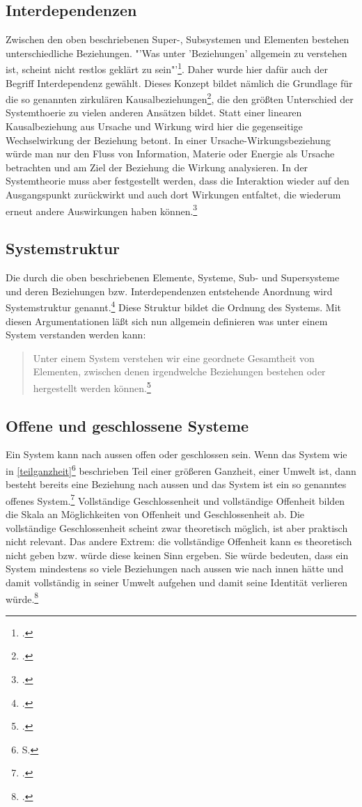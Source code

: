 \documentclass[a4paper,12pt]{article}
\begin{document}
\subsection{Interdependenzen}\label{interdep}
Zwischen den oben beschriebenen Super-, Subsystemen und Elementen bestehen unterschiedliche Beziehungen. "'Was unter 'Beziehungen' allgemein zu verstehen ist, scheint nicht restlos geklärt zu sein"'\footcite[109]{Ulrich1968}. Daher wurde hier dafür auch der Begriff Interdependenz gewählt. Dieses Konzept bildet nämlich die Grundlage für die so genannten zirkulären Kausalbeziehungen\footcite[S. 104]{Helfrich2024}, die den größten Unterschied der Systemthoerie zu vielen anderen Ansätzen bildet. Statt einer linearen Kausalbeziehung aus Ursache und Wirkung wird hier die gegenseitige Wechselwirkung der Beziehung betont. In einer Ursache-Wirkungsbeziehung würde man nur den Fluss von Information, Materie oder Energie als Ursache betrachten und am Ziel der Beziehung die Wirkung analysieren. In der Systemtheorie muss aber festgestellt werden, dass die Interaktion wieder auf den Ausgangspunkt zurückwirkt und auch dort Wirkungen entfaltet, die wiederum erneut andere Auswirkungen haben können.\footcite[S. 104]{Helfrich2024} 
\subsection{Systemstruktur}\label{systemstruktur}
Die durch die oben beschriebenen Elemente, Systeme, Sub- und Supersysteme und deren Beziehungen bzw. Interdependenzen entstehende Anordnung wird Systemstruktur genannt.\footcite[S. 110]{Ulrich1968} Diese Struktur bildet die Ordnung des Systems. Mit diesen Argumentationen läßt sich nun allgemein definieren was unter einem System verstanden werden kann:
\begin{quote}
    Unter einem System verstehen wir eine geordnete Gesamtheit von Elementen, zwischen denen irgendwelche Beziehungen bestehen oder hergestellt werden können.\footcite[S. 105]{Ulrich1968}
\end{quote}
\subsection{Offene und geschlossene Systeme}\label{offengeschlossen}
Ein System kann nach aussen offen oder geschlossen sein. Wenn das System wie in \ref{teilganzheit}\footnote{S. \pageref{teilganzheit}} beschrieben Teil einer größeren Ganzheit, einer Umwelt ist, dann besteht bereits eine Beziehung nach aussen und das System ist ein so genanntes offenes System.\footcite[S. 112]{Ulrich1968} Vollständige Geschlossenheit und vollständige Offenheit bilden die Skala an Möglichkeiten von Offenheit und Geschlossenheit ab. Die vollständige Geschlossenheit scheint zwar theoretisch möglich, ist aber praktisch nicht relevant. Das andere Extrem: die vollständige Offenheit kann es theoretisch nicht geben bzw. würde diese keinen Sinn ergeben. Sie würde bedeuten, dass ein System mindestens so viele Beziehungen nach aussen wie nach innen hätte und damit vollständig in seiner Umwelt aufgehen und damit seine Identität verlieren würde.\footcite[S.112 - 113]{Ulrich1968} 
\end{document}
